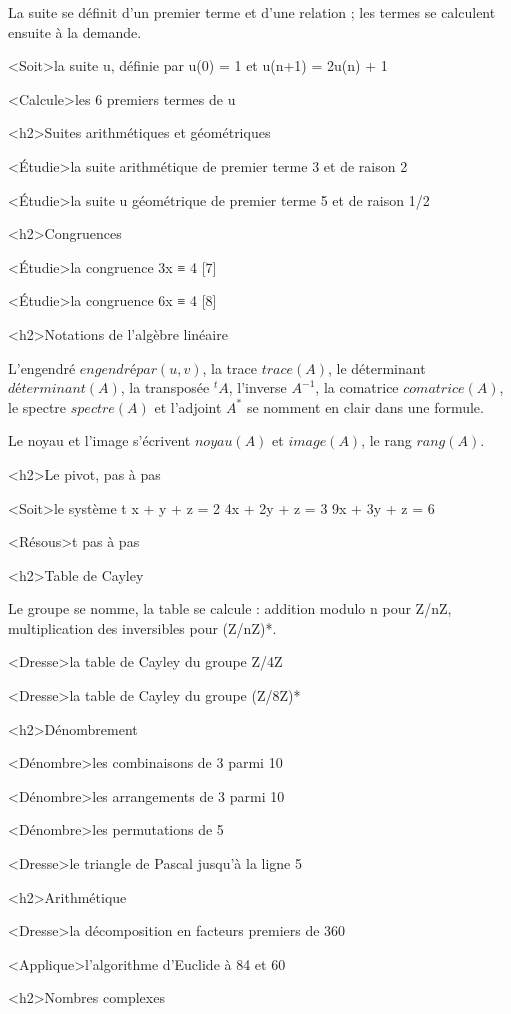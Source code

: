 \documentclass[marges=20, taille=11, precision=3]{texecole}
\begin{document}
La suite se définit d'un premier terme et d'une relation ; les termes se calculent ensuite à la demande.

<Soit>la suite u, définie par u(0) = 1 et u(n+1) = 2u(n) + 1

<Calcule>les 6 premiers termes de u

<h2>Suites arithmétiques et géométriques

<Étudie>la suite arithmétique de premier terme 3 et de raison 2

<Étudie>la suite u géométrique de premier terme 5 et de raison 1/2

<h2>Congruences

<Étudie>la congruence 3x ≡ 4 [7]

<Étudie>la congruence 6x ≡ 4 [8]

<h2>Notations de l'algèbre linéaire

L'engendré $engendré par(u, v)$, la trace $trace(A)$, le déterminant $déterminant(A)$, la transposée $^t{A}$, l'inverse $A^{-1}$, la comatrice $comatrice(A)$, le spectre $spectre(A)$ et l'adjoint $A^*$ se nomment en clair dans une formule.

Le noyau et l'image s'écrivent $noyau(A)$ et $image(A)$, le rang $rang(A)$.

<h2>Le pivot, pas à pas

<Soit>le système t {
	x + y + z = 2
	4x + 2y + z = 3
	9x + 3y + z = 6
}

<Résous>t pas à pas

<h2>Table de Cayley

Le groupe se nomme, la table se calcule : addition modulo n pour Z/nZ, multiplication des inversibles pour (Z/nZ)*.

<Dresse>la table de Cayley du groupe Z/4Z

<Dresse>la table de Cayley du groupe (Z/8Z)*

<h2>Dénombrement

<Dénombre>les combinaisons de 3 parmi 10

<Dénombre>les arrangements de 3 parmi 10

<Dénombre>les permutations de 5

<Dresse>le triangle de Pascal jusqu'à la ligne 5

<h2>Arithmétique

<Dresse>la décomposition en facteurs premiers de 360

<Applique>l'algorithme d'Euclide à 84 et 60

<h2>Nombres complexes
\end{document}
